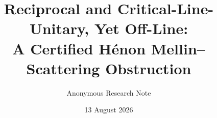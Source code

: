 \documentclass[11pt]{article}
\title{Reciprocal and Critical-Line-Unitary, Yet Off-Line:\\
A Certified H\'enon Mellin--Scattering Obstruction}
\author{Anonymous Research Note}
\date{13 August 2026}
\theoremstyle{definition}
\theoremstyle{remark}
\begin{document}
\maketitle
\begin{abstract}

\end{abstract}









\appendix


\end{document}
